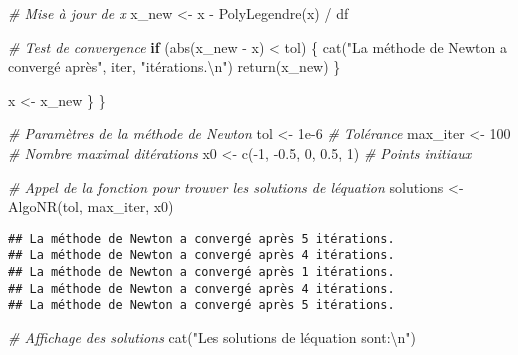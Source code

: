 \documentclass[
]{article}
\newenvironment{Shaded}{\begin{snugshade}}{\end{snugshade}}
\newcommand{\CommentTok}[1]{\textcolor[rgb]{0.56,0.35,0.01}{\textit{#1}}}
\newcommand{\ControlFlowTok}[1]{\textcolor[rgb]{0.13,0.29,0.53}{\textbf{#1}}}
\newcommand{\DecValTok}[1]{\textcolor[rgb]{0.00,0.00,0.81}{#1}}
\newcommand{\FloatTok}[1]{\textcolor[rgb]{0.00,0.00,0.81}{#1}}
\newcommand{\FunctionTok}[1]{\textcolor[rgb]{0.00,0.00,0.00}{#1}}
\newcommand{\NormalTok}[1]{#1}
\newcommand{\OtherTok}[1]{\textcolor[rgb]{0.56,0.35,0.01}{#1}}
\newcommand{\SpecialCharTok}[1]{\textcolor[rgb]{0.00,0.00,0.00}{#1}}
\newcommand{\StringTok}[1]{\textcolor[rgb]{0.31,0.60,0.02}{#1}}
\begin{document}
\begin{Shaded}
\begin{Highlighting}[]
    \CommentTok{\# Mise à jour de x}
\NormalTok{    x\_new }\OtherTok{\textless{}{-}}\NormalTok{ x }\SpecialCharTok{{-}} \FunctionTok{PolyLegendre}\NormalTok{(x) }\SpecialCharTok{/}\NormalTok{ df}
    
    \CommentTok{\# Test de convergence}
    \ControlFlowTok{if}\NormalTok{ (}\FunctionTok{abs}\NormalTok{(x\_new }\SpecialCharTok{{-}}\NormalTok{ x) }\SpecialCharTok{\textless{}}\NormalTok{ tol) \{}
      \FunctionTok{cat}\NormalTok{(}\StringTok{"La méthode de Newton a convergé après"}\NormalTok{, iter, }\StringTok{"itérations.}\SpecialCharTok{\textbackslash{}n}\StringTok{"}\NormalTok{)}
      \FunctionTok{return}\NormalTok{(x\_new)}
\NormalTok{    \}}
    
\NormalTok{    x }\OtherTok{\textless{}{-}}\NormalTok{ x\_new}
\NormalTok{  \}}
\NormalTok{\}}

\CommentTok{\# Paramètres de la méthode de Newton}
\NormalTok{tol }\OtherTok{\textless{}{-}} \FloatTok{1e{-}6}  \CommentTok{\# Tolérance}
\NormalTok{max\_iter }\OtherTok{\textless{}{-}} \DecValTok{100}  \CommentTok{\# Nombre maximal d\textquotesingle{}itérations}
\NormalTok{x0 }\OtherTok{\textless{}{-}} \FunctionTok{c}\NormalTok{(}\SpecialCharTok{{-}}\DecValTok{1}\NormalTok{, }\SpecialCharTok{{-}}\FloatTok{0.5}\NormalTok{, }\DecValTok{0}\NormalTok{, }\FloatTok{0.5}\NormalTok{, }\DecValTok{1}\NormalTok{)  }\CommentTok{\# Points initiaux}

\CommentTok{\# Appel de la fonction pour trouver les solutions de l\textquotesingle{}équation}
\NormalTok{solutions }\OtherTok{\textless{}{-}} \FunctionTok{AlgoNR}\NormalTok{(tol, max\_iter, x0)}
\end{Highlighting}
\end{Shaded}

\begin{verbatim}
## La méthode de Newton a convergé après 5 itérations.
## La méthode de Newton a convergé après 4 itérations.
## La méthode de Newton a convergé après 1 itérations.
## La méthode de Newton a convergé après 4 itérations.
## La méthode de Newton a convergé après 5 itérations.
\end{verbatim}

\begin{Shaded}
\begin{Highlighting}[]
\CommentTok{\# Affichage des solutions}
\FunctionTok{cat}\NormalTok{(}\StringTok{"Les solutions de l\textquotesingle{}équation sont:}\SpecialCharTok{\textbackslash{}n}\StringTok{"}\NormalTok{)}
\end{Highlighting}
\end{Shaded}
\end{document}

